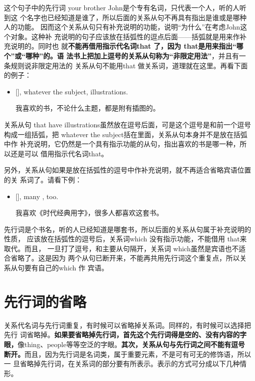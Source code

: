 这个句子中的先行词 your brother John是个专有名词，只代表一个人，听的人听到这
个名字也已经知道是谁了，所以后面的关系从句不再具有指出是谁或是哪种人的功能。
因而这个关系从句只有补充说明的功能，说明“为什么”在考虑John这个对象。这种补
充说明的句子应该放在括弧性的逗点后面——括弧就是用来作补充说明的。同时也
就\textbf{不能再借用指示代名词that 了，因为 that是用来指出“哪个”或“哪种”的。语
  法书上把加上逗号的关系从句称为“非限定用法”}，并且有一条规则说非限定用法的
关系从句不能用that 做关系词，道理就在这里。再看下面的例子：
\begin{itemize}
\item {}  [], whatever the
  subject,   illustrations.

  我喜欢的书，不论什么主题，都是附有插图的。
\end{itemize}

关系从句 that have illustrations虽然放在逗号后面，可是这个逗号是和前一个逗号
构成一组括弧，把 whatever the subject括在里面，关系从句本身并不是放在括弧中作
补充说明，它仍然是一个具有指示功能的从句，指出喜欢的书是哪一种，所以还是可以
借用指示代名词that。

另外，关系从句如果是放在括弧性的逗号中作补充说明，就不再适合省略宾语位置的关
系词了。请看下例：
\begin{itemize}
\item {}  [],
   many  , too.

  我喜欢《时代经典用字》，很多人都喜欢这套书。
\end{itemize}

先行词是个书名，听的人已经知道是哪套书，所以后面的关系从句属于补充说明的性质，
应该放在括弧性的逗号后，关系词which 没有指示功能，不能借用 that来取代。而且，
一旦打了逗号，和主要从句隔开，关系词 which虽然是宾语也不适合省略了。这是因为
两个从句已断开来，不能再共用先行词这个重复点，所以关系从句要有自己的which 作
宾语。

\section{先行词的省略}

关系代名词与先行词重复，有时候可以省略掉关系词。同样的，有时候可以选择把先行
词省略掉。\textbf{如果要省略掉先行词，首先这个先行词得是空的、没有内容的字
  眼，}像thing、people等等空泛的字眼。\textbf{其次，关系从句与先行词之间不能有逗号
  断开。}而且，因为先行词是名词类，属于重要元素，不是可有可无的修饰语，所以一
旦省略掉先行词，在关系词的部分要有所表示。表示的方式可分成以下几种情形。

